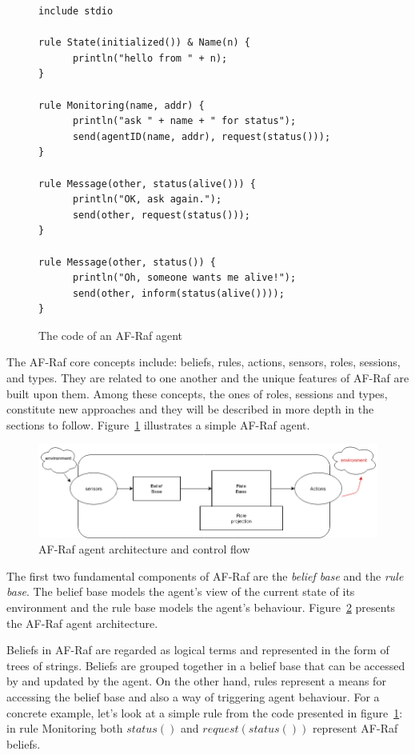 \documentclass[a4paper,12pt,oneside,fleqn]{book} %
\begin{document}
{\begin{figure}\footnotesize %
\begin{verbatim}
include stdio

rule State(initialized()) & Name(n) {
      println("hello from " + n);
}

rule Monitoring(name, addr) {
      println("ask " + name + " for status");
      send(agentID(name, addr), request(status()));
}

rule Message(other, status(alive())) {
      println("OK, ask again.");
      send(other, request(status()));
}

rule Message(other, status()) {
      println("Oh, someone wants me alive!");
      send(other, inform(status(alive())));
}
\end{verbatim}
\caption{The code of an AF-Raf agent}
\label{fig:AF-Raf}
\end{figure} %

The AF-Raf core concepts include: beliefs, rules, actions, sensors, roles,
sessions, and types. They are related to one another and the unique
features of AF-Raf are built upon them. Among these concepts, the ones of
roles, sessions and types, constitute new approaches and they will be
described in more depth in the sections to follow. Figure~\ref{fig:AF-Raf}
illustrates a simple AF-Raf agent.

\begin{figure}\footnotesize %
\includegraphics{AF-RafArchitecture2.png}
\caption{AF-Raf agent architecture and control flow}
\label{fig:AF-RafArch}
\end{figure} %

The first two fundamental components of AF-Raf are the \textit{belief base}
and the \textit{rule base}. The belief base models the agent's view of the
current state of its environment and the rule base models the agent's
behaviour. Figure~\ref{fig:AF-RafArch} presents the AF-Raf agent
architecture.

Beliefs in AF-Raf are regarded as logical terms and represented in the form
of trees of strings. Beliefs are grouped together in a belief base that can
be accessed by and updated by the agent. On the other hand, rules represent
a means for accessing the belief base and also a way of triggering agent
behaviour. For a concrete example, let's look at a simple rule from the
code presented in figure~\ref{fig:AF-Raf}: in rule Monitoring both
$status()$ and $request(status())$ represent AF-Raf beliefs.

}
\end{document}
